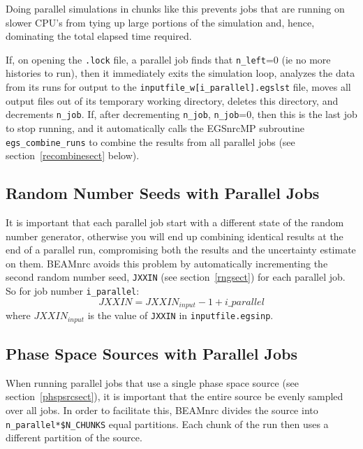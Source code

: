 \documentclass[12pt,twoside]{article}
\begin{document}
Doing parallel simulations in chunks like this prevents jobs that are
running on slower CPU's from tying up large portions of the simulation
and, hence, dominating the total elapsed time required.

 
If, on opening the {\tt .lock} file, a parallel job finds that
{\tt n\_left}=0 (ie no more histories to run), then it immediately
exits the simulation loop, analyzes the data from its runs for output
to the {\tt inputfile\_w[i\_parallel].egslst} file, moves all output
files out of its temporary working directory, deletes this directory,
and decrements {\tt n\_job}.  If, after decrementing {\tt n\_job},
{\tt n\_job}=0, then this is the last job to stop running, and it
automatically calls the EGSnrcMP subroutine {\tt egs\_combine\_runs}
to combine the results from all parallel jobs
(see section~\ref{recombinesect} below).

\subsection{Random Number Seeds with Parallel Jobs}
It is important that each parallel job start with a different
state of the random number generator,
otherwise you will end up combining identical
results at the end of a parallel run, compromising both the results
and the uncertainty estimate on them.
BEAMnrc avoids this problem by automatically incrementing the
second random number seed, {\tt JXXIN} (see section~\ref{rngsect}) for
each parallel job.  So for job number {\tt i\_parallel}:
\begin{equation}
JXXIN=JXXIN_{input} -1 + i\_parallel
\end{equation}
where $JXXIN_{input}$ is the value of {\tt JXXIN} in
{\tt inputfile.egsinp}.

\subsection{Phase Space Sources with Parallel Jobs}
\label{phspparsect}

When running parallel jobs that use a single phase space source
(see section~\ref{phspsrcsect}), it is important that the entire
source be evenly sampled over all jobs.  In order to
facilitate this, BEAMnrc divides the source into
{\tt n\_parallel*\$N\_CHUNKS} equal partitions.  Each chunk of
the run then uses a different partition of the source.
\end{document}

